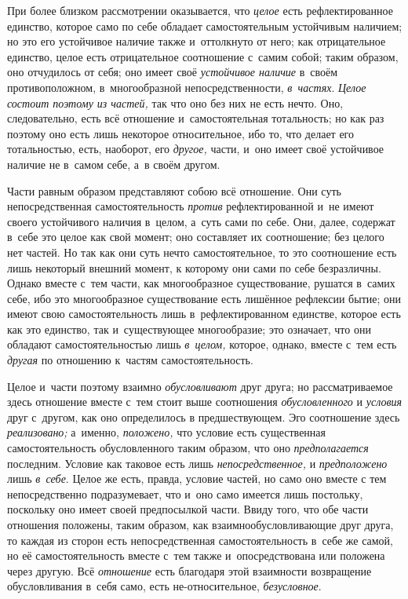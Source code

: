 При более близком рассмотрении оказывается, что
{\em целое} есть рефлектированное единство, которое
само по себе обладает самостоятельным устойчивым наличием; но это его
устойчивое наличие также и~оттолкнуто от него; как отрицательное единство,
целое есть отрицательное соотношение с~самим собой; таким образом, оно
отчудилось от себя; оно имеет своё {\em устойчивое
наличие} в~своём противоположном, в~многообразной непосредственности,
{\em в~частях}. {\em Целое состоит
поэтому из частей,} так что оно без них не есть нечто. Оно, следовательно,
есть всё отношение и~самостоятельная тотальность; но как раз поэтому оно
есть лишь некоторое относительное, ибо то, что делает его тотальностью,
есть, наоборот, его {\em другое,} части, и~оно имеет
своё устойчивое наличие не в~самом себе, а~в своём другом.

Части равным образом представляют собою всё отношение. Они суть
непосредственная самостоятельность {\em против}
рефлектированной и~не имеют своего устойчивого наличия в~целом, а~суть сами
по себе. Они, далее, содержат в~себе это целое как свой момент; оно
составляет их соотношение; без целого нет частей. Но так как они суть нечто
самостоятельное, то это соотношение есть лишь некоторый внешний момент, к
которому они сами по себе безразличны. Однако вместе с~тем части, как
многообразное существование, рушатся в~самих себе, ибо это многообразное
существование есть лишённое рефлексии бытие; они имеют свою
самостоятельность лишь в~рефлектированном единстве, которое есть как это
единство, так и~существующее многообразие; это означает, что они обладают
самостоятельностью лишь {\em в~целом,} которое, однако,
вместе с~тем есть {\em другая} по отношению к~частям самостоятельность.

Целое и~части поэтому взаимно {\em обусловливают} друг
друга; но рассматриваемое здесь отношение вместе с~тем стоит выше
соотношения {\em обусловленного} и
{\em условия} друг с~другом, как оно определилось в
предшествующем. Эго соотношение здесь {\em реализовано;} а~именно,
{\em положено,} что условие есть существенная
самостоятельность обусловленного таким образом, что оно
{\em предполагается} последним. Условие как таковое
есть лишь {\em непосредственное,} и {\em предположено} лишь
{\em в~себе}. Целое же есть, правда, условие частей, но само оно вместе
с тем непосредственно подразумевает, что и~оно само имеется лишь постольку,
поскольку оно имеет своей предпосылкой части. Ввиду того, что обе части
отношения положены, таким образом, как взаимнообусловливающие друг друга,
то каждая из сторон есть непосредственная самостоятельность в~себе же
самой, но её самостоятельность вместе с~тем также и~опосредствована или
положена через другую. Всё {\em отношение} есть
благодаря этой взаимности возвращение обусловливания в~себя само, есть
не-относительное, {\em безусловное}.

